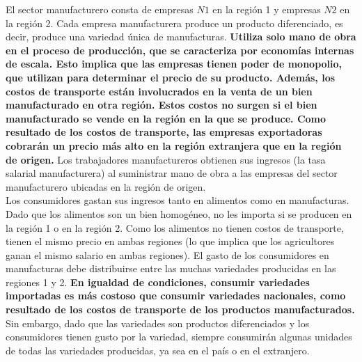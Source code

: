 El sector manufacturero consta de empresas $N1$ en la región 1 y empresas $N2$ en la región 2. Cada empresa manufacturera produce un producto diferenciado, es decir, produce una variedad única de manufacturas. \textbf{Utiliza solo mano de obra en el proceso de producción, que se caracteriza por economías internas de escala. Esto implica que las empresas tienen poder de monopolio, que utilizan para determinar el precio de su producto. Además, los costos de transporte están involucrados en la venta de un bien manufacturado en otra región. Estos costos no surgen si el bien manufacturado se vende en la región en la que se produce. Como resultado de los costos de transporte, las empresas exportadoras cobrarán un precio más alto en la región extranjera que en la región de origen.} Los trabajadores manufactureros obtienen sus ingresos (la tasa salarial manufacturera) al suministrar mano de obra a las empresas del sector manufacturero ubicadas en la región de origen.\\
Los consumidores gastan sus ingresos tanto en alimentos como en manufacturas. Dado que los alimentos son un bien homogéneo, no les importa si se producen en la región 1 o en la región 2. Como los alimentos no tienen costos de transporte, tienen el mismo precio en ambas regiones (lo que implica que los agricultores ganan el mismo salario en ambas regiones). El gasto de los consumidores en manufacturas debe distribuirse entre las muchas variedades producidas en las regiones 1 y 2. \textbf{En igualdad de condiciones, consumir variedades importadas es más costoso que consumir variedades nacionales, como resultado de los costos de transporte de los productos manufacturados.} Sin embargo, dado que las variedades son productos diferenciados y los consumidores tienen gusto por la variedad, siempre consumirán algunas unidades de todas las variedades producidas, ya sea en el país o en el extranjero.\\
